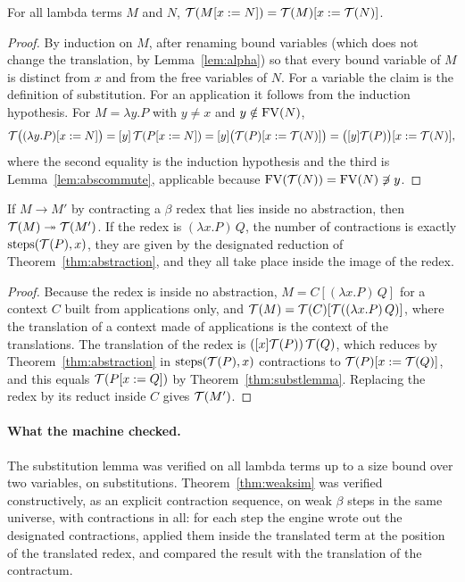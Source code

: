 \begin{theorem}\label{thm:substlemma}
For all lambda terms $M$ and $N$, $\mathcal{T}(M[x:=N])=\mathcal{T}(M)[x:=\mathcal{T}(N)]$.
\end{theorem}

\begin{proof}
By induction on $M$, after renaming bound variables (which does not change the translation, by Lemma~\ref{lem:alpha}) so that every bound variable of $M$ is distinct from $x$ and from the free variables of $N$. For a variable the claim is the definition of substitution. For an application it follows from the induction hypothesis. For $M=\lambda y.P$ with $y\ne x$ and $y\notin\mathrm{FV}(N)$,
\[
\mathcal{T}\bigl((\lambda y.P)[x:=N]\bigr)=[y]\,\mathcal{T}(P[x:=N])=[y]\bigl(\mathcal{T}(P)[x:=\mathcal{T}(N)]\bigr)=\bigl([y]\mathcal{T}(P)\bigr)[x:=\mathcal{T}(N)],
\]
where the second equality is the induction hypothesis and the third is Lemma~\ref{lem:abscommute}, applicable because $\mathrm{FV}(\mathcal{T}(N))=\mathrm{FV}(N)\not\ni y$.
\end{proof}

\begin{theorem}\label{thm:weaksim}
If $M\to M'$ by contracting a $\beta$ redex that lies inside no abstraction, then $\mathcal{T}(M)\twoheadrightarrow\mathcal{T}(M')$. If the redex is $(\lambda x.P)\,Q$, the number of contractions is exactly $\mathrm{steps}(\mathcal{T}(P),x)$, they are given by the designated reduction of Theorem~\ref{thm:abstraction}, and they all take place inside the image of the redex.
\end{theorem}

\begin{proof}
Because the redex is inside no abstraction, $M=C[(\lambda x.P)\,Q]$ for a context $C$ built from applications only, and $\mathcal{T}(M)=\mathcal{T}(C)[\mathcal{T}((\lambda x.P)\,Q)]$, where the translation of a context made of applications is the context of the translations. The translation of the redex is $([x]\mathcal{T}(P))\,\mathcal{T}(Q)$, which reduces by Theorem~\ref{thm:abstraction} in $\mathrm{steps}(\mathcal{T}(P),x)$ contractions to $\mathcal{T}(P)[x:=\mathcal{T}(Q)]$, and this equals $\mathcal{T}(P[x:=Q])$ by Theorem~\ref{thm:substlemma}. Replacing the redex by its reduct inside $C$ gives $\mathcal{T}(M')$.
\end{proof}

\paragraph{What the machine checked.} The substitution lemma was verified on all lambda terms up to a size bound over two variables, on \factSubstChecked{} substitutions. Theorem~\ref{thm:weaksim} was verified constructively, as an explicit contraction sequence, on \factWeakSim{} weak $\beta$ steps in the same universe, with \factWeakContractions{} contractions in all: for each step the engine wrote out the designated contractions, applied them inside the translated term at the position of the translated redex, and compared the result with the translation of the contractum.

